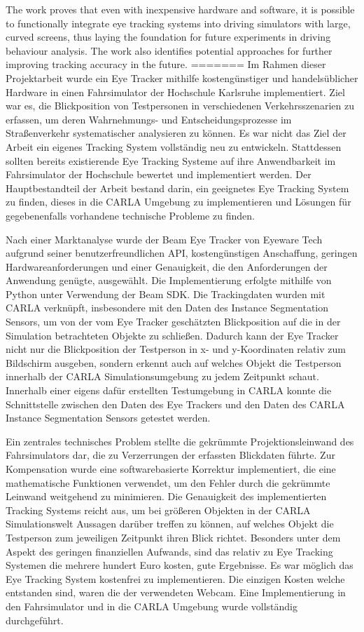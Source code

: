 The work proves that even with inexpensive hardware and software, it is possible to functionally integrate eye tracking systems into driving simulators with large, curved screens, thus laying the foundation for future experiments in driving behaviour analysis. The work also identifies potential approaches for further improving tracking accuracy in the future. 
=======
Im Rahmen dieser Projektarbeit wurde ein Eye Tracker mithilfe kostengünstiger und handelsüblicher Hardware in einen Fahrsimulator der Hochschule Karlsruhe implementiert. Ziel war es, die Blickposition von Testpersonen in verschiedenen Verkehrsszenarien zu erfassen, um deren Wahrnehmungs- und Entscheidungsprozesse im Straßenverkehr systematischer analysieren zu können. Es war nicht das Ziel der Arbeit ein eigenes Tracking System vollständig neu zu entwickeln. Stattdessen sollten bereits existierende Eye Tracking Systeme auf ihre Anwendbarkeit im Fahrsimulator der Hochschule bewertet und implementiert werden. Der Hauptbestandteil der Arbeit bestand darin, ein geeignetes Eye Tracking System zu finden, dieses in die CARLA Umgebung zu implementieren und Lösungen für gegebenenfalls vorhandene technische Probleme zu finden. 

Nach einer Marktanalyse wurde der Beam Eye Tracker von Eyeware Tech aufgrund seiner benutzerfreundlichen API, kostengünstigen Anschaffung, geringen Hardwareanforderungen und einer Genauigkeit, die den Anforderungen der Anwendung genügte, ausgewählt. Die Implementierung erfolgte mithilfe von Python unter Verwendung der Beam SDK. Die Trackingdaten wurden mit CARLA verknüpft, insbesondere mit den Daten des Instance Segmentation Sensors, um von der vom Eye Tracker geschätzten Blickposition auf die in der Simulation betrachteten Objekte zu schließen. Dadurch kann der Eye Tracker nicht nur die Blickposition der Testperson in x- und y-Koordinaten relativ zum Bildschirm ausgeben, sondern erkennt auch auf welches Objekt die Testperson innerhalb der CARLA Simulationsumgebung zu jedem Zeitpunkt schaut. Innerhalb einer eigens dafür erstellten Testumgebung in CARLA konnte die Schnittstelle zwischen den Daten des Eye Trackers und den Daten des CARLA Instance Segmentation Sensors getestet werden. 

Ein zentrales technisches Problem stellte die gekrümmte Projektionsleinwand des Fahrsimulators dar, die zu Verzerrungen der erfassten Blickdaten führte. Zur Kompensation wurde eine softwarebasierte Korrektur implementiert, die eine mathematische Funktionen verwendet, um den Fehler durch die gekrümmte Leinwand weitgehend zu minimieren. Die Genauigkeit des implementierten Tracking Systems reicht aus, um bei größeren Objekten in der CARLA Simulationswelt Aussagen darüber treffen zu können, auf welches Objekt die Testperson zum jeweiligen Zeitpunkt ihren Blick richtet. Besonders unter dem Aspekt des geringen finanziellen Aufwands, sind das relativ zu Eye Tracking Systemen die mehrere hundert Euro kosten, gute Ergebnisse. Es war möglich das Eye Tracking System kostenfrei zu implementieren. Die einzigen Kosten welche entstanden sind, waren die der verwendeten Webcam. Eine Implementierung in den Fahrsimulator und in die CARLA Umgebung wurde vollständig durchgeführt.

